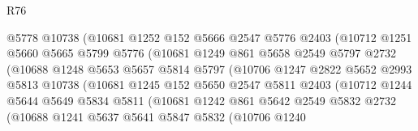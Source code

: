 \begin{lexlean}{R76}
\begin{coremodule}
                          @5778
                          @10738
                          (@10681
                            @1252
                            @152
                            @5666
                            @2547
                            @5776
                            @2403
                            (@10712
                              @1251
                              @5660
                              @5665
                              @5799
                              @5776
                              (@10681
                                @1249
                                @861
                                @5658
                                @2549
                                @5797
                                @2732
                                (@10688
                                  @1248
                                  @5653
                                  @5657
                                  @5814
                                  @5797
                                  (@10706
                                    @1247
                                    @2822
                                    @5652
                                    @2993
                                    @5813
                                    @10738
                                    (@10681
                                      @1245
                                      @152
                                      @5650
                                      @2547
                                      @5811
                                      @2403
                                      (@10712
                                        @1244
                                        @5644
                                        @5649
                                        @5834
                                        @5811
                                        (@10681
                                          @1242
                                          @861
                                          @5642
                                          @2549
                                          @5832
                                          @2732
                                          (@10688
                                            @1241
                                            @5637
                                            @5641
                                            @5847
                                            @5832
                                            (@10706
                                              @1240

\end{coremodule}
\end{lexlean}
